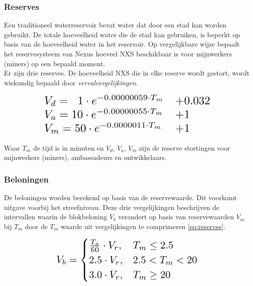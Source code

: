 \documentclass[11pt]{article}
\begin{document}
\subsubsection{Reserves}

Een traditioneel waterreservoir bevat water dat door een stad kan worden gebruikt. De totale hoeveelheid water die de stad kan gebruiken, is beperkt op basis van de hoeveelheid water in het reservoir. Op vergelijkbare wijze bepaalt het reservesysteem van Nexus hoeveel NXS beschikbaar is voor mijnwerkers (miners) op een bepaald moment.\\ 

\noindent Er zijn drie reserves. De hoeveelheid NXS die in elke reserve wordt gestort, wordt wiskundig bepaald door \textit{vervalvergelijkingen}.

\begin{equation}\label{eq:reserves}
\resizebox{.75\hsize}{!}{$
\begin{array}{ll}
      V_{d} = \;\;1 \cdot e^{-0.00000059 \cdot T_{m}} & + 0.032 \\
      V_{a} = 10 \cdot e^{-0.00000055 \cdot T_{m}} & + 1 \\
      V_{m} = 50 \cdot e^{-0.0000011 \cdot T_{m}} & + 1 \\
\end{array} $}
\end{equation}

\noindent Waar $T_m$ de tijd is in minuten en $V_{d}$, $V_{a}$, $V_{m}$ zijn de reserve stortingen voor mijnwerkers (miners), ambassadeurs en ontwikkelaars.

\pagebreak
\subsubsection{Beloningen}

De beloningen worden berekend op basis van de reservewaarde. 
Dit voorkomt uitgave voorbij het streefniveau.
\noindent Deze drie vergelijkingen beschrijven de intervallen waarin de blokbeloning $V_{b}$ verandert op basis van reservewaarden $V_{m}$ bij $T_{m}$ door de $T_{m}$ waarde uit vergelijkingen te comprimeren \ref{eq:reserves}.

\begin{equation}
\resizebox{.60\hsize}{!}{$
    V_b= 
\begin{cases}
    \frac{T_{a}}{60} \cdot V_{r}, & T_{m} \leq 2.5\\
    2.5 \cdot V_{r}, & 2.5 < T_{m} < 20\\
    3.0 \cdot V_{r}, & T_{m} \geq 20
\end{cases}
$}
\end{equation}
\end{document}
